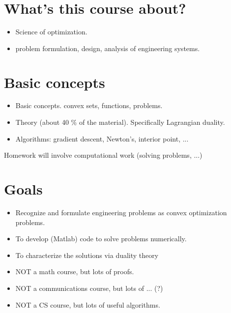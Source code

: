 %
%
\section{What's this course about?}

\begin{itemize}
\item Science of optimization.
\item problem formulation, design, analysis of engineering systems.
\end{itemize}

\section{Basic concepts}

\begin{itemize}
\item Basic concepts.  convex sets, functions, problems.
\item Theory (about 40 \% of the material).  Specifically Lagrangian duality.
\item Algorithms: gradient descent, Newton's, interior point, ...
\end{itemize}

Homework will involve computational work (solving problems, ...)

\section{Goals}

\begin{itemize}
\item Recognize and formulate engineering problems as convex optimization problems.
\item To develop (Matlab) code to solve problems numerically.
\item To characterize the solutions via duality theory
\item NOT a math course, but lots of proofs.
\item NOT a communications course, but lots of ... (?)
\item NOT a CS course, but lots of useful algorithms.
\end{itemize}


